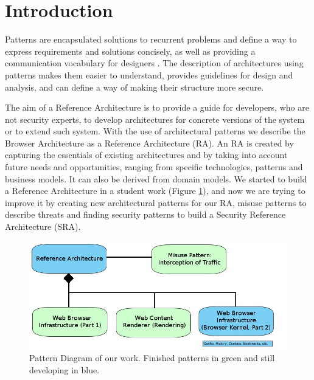 \documentclass[prodmode,acmtecs]{acmsmall}
\begin{document}





\maketitle
\section{Introduction}
Patterns are encapsulated solutions to recurrent problems and define a way to express requirements and solutions concisely, as well as providing a communication vocabulary for designers \cite{gamma1994design}. The description of architectures using patterns makes them easier to understand, provides guidelines for design and analysis, and can define a way of making their structure more secure.

The aim of a Reference Architecture is to provide a guide for developers, who are not security experts, to develop architectures for concrete versions of the system or to extend such system. With the use of architectural patterns we describe the Browser Architecture as a Reference Architecture (RA). An RA is created by capturing the essentials of existing architectures and by taking into account future needs and opportunities, ranging from specific technologies, patterns and business models. It can also be derived from domain models. We started to build a Reference Architecture in a student work (Figure \ref{fig:relations}), and now we are trying to improve it by creating new architectural patterns for our RA, misuse patterns to describe threats and finding security patterns to build a Security Reference Architecture (SRA). 

    \begin{figure}[h!t]
      \vspace*{0.8cm}
      \centering
      \hspace{0.5cm}\includegraphics[scale=0.6]{figures/relations.jpg}
      \vspace*{0.8cm}
      \caption{Pattern Diagram of our work. Finished patterns in green and still developing in blue.}
      \label{fig:relations}
    \end{figure}
\end{document}
